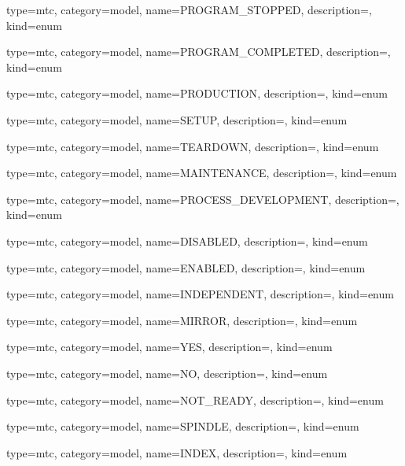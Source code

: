 {
  type=mtc,
  category=model,
  name={PROGRAM\_STOPPED},
  description={},
  kind={enum}
}


{
  type=mtc,
  category=model,
  name={PROGRAM\_COMPLETED},
  description={},
  kind={enum}
}


{
  type=mtc,
  category=model,
  name={PRODUCTION},
  description={},
  kind={enum}
}


{
  type=mtc,
  category=model,
  name={SETUP},
  description={},
  kind={enum}
}


{
  type=mtc,
  category=model,
  name={TEARDOWN},
  description={},
  kind={enum}
}


{
  type=mtc,
  category=model,
  name={MAINTENANCE},
  description={},
  kind={enum}
}


{
  type=mtc,
  category=model,
  name={PROCESS\_DEVELOPMENT},
  description={},
  kind={enum}
}


{
  type=mtc,
  category=model,
  name={DISABLED},
  description={},
  kind={enum}
}


{
  type=mtc,
  category=model,
  name={ENABLED},
  description={},
  kind={enum}
}


{
  type=mtc,
  category=model,
  name={INDEPENDENT},
  description={},
  kind={enum}
}


{
  type=mtc,
  category=model,
  name={MIRROR},
  description={},
  kind={enum}
}


{
  type=mtc,
  category=model,
  name={YES},
  description={},
  kind={enum}
}


{
  type=mtc,
  category=model,
  name={NO},
  description={},
  kind={enum}
}


{
  type=mtc,
  category=model,
  name={NOT\_READY},
  description={},
  kind={enum}
}


{
  type=mtc,
  category=model,
  name={SPINDLE},
  description={},
  kind={enum}
}


{
  type=mtc,
  category=model,
  name={INDEX},
  description={},
  kind={enum}
}


